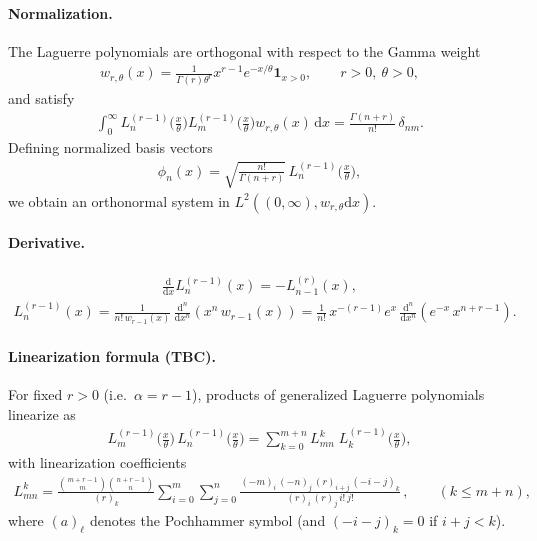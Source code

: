\documentclass[a4paper,11pt]{article}
\numberwithin{equation}{section}
\theoremstyle{plain}
\theoremstyle{definition}
\theoremstyle{remark}
\newcommand{\1}{\ensuremath{\mathds{1}}\xspace}
\newcommand{\dd}{\ensuremath{{\textrm{d}}}\xspace}
\begin{document}
\paragraph{Normalization.}
The Laguerre polynomials are orthogonal with respect to the Gamma weight
\begin{align}
w_{r,\theta}(x)
=
\frac{1}{\Gamma(r)\theta^r}
x^{r-1}e^{-x/\theta}\mathbf{1}_{x>0},
\qquad r>0,\ \theta>0,
\end{align}
and satisfy
\begin{align}
\int_0^\infty
L_n^{(r-1)}\!\Big(\frac{x}{\theta}\Big)
L_m^{(r-1)}\!\Big(\frac{x}{\theta}\Big)
w_{r,\theta}(x)\,\dd x
=
\frac{\Gamma(n+r)}{n!}\,\delta_{nm}.
\end{align}
Defining normalized basis vectors
\begin{align}
\phi_n(x)
=
\sqrt{\frac{n!}{\Gamma(n+r)}}
\,L_n^{(r-1)}\!\Big(\frac{x}{\theta}\Big),
\end{align}
we obtain an orthonormal system in $L^2((0,\infty),w_{r,\theta}\dd x)$.
\paragraph{Derivative.}
\begin{align}
\frac{\dd}{\dd x}L_n^{(r-1)}(x)=-L_{n-1}^{(r)}(x),
\end{align}
\begin{align}
L_n^{(r-1)}(x)
=\frac{1}{n!\,w_{r-1}(x)}\,\frac{\dd^n}{\dd x^n}\!\left(x^n\,w_{r-1}(x)\right)
=\frac{1}{n!}\,x^{-(r-1)}e^{x}\,\frac{\dd^n}{\dd x^n}\!\left(e^{-x}\,x^{n+r-1}\right).
\end{align}
\paragraph{Linearization formula (TBC).}
For fixed $r>0$ (i.e.\ $\alpha=r-1$), products of generalized Laguerre polynomials linearize as
\begin{align}
L_m^{(r-1)}\!\Big(\frac{x}{\theta}\Big)\,L_n^{(r-1)}\!\Big(\frac{x}{\theta}\Big)
=\sum_{k=0}^{m+n} L^{k}_{mn}\;L_k^{(r-1)}\!\Big(\frac{x}{\theta}\Big),
\end{align}
with linearization coefficients
\begin{align}
L^{k}_{mn}
=\frac{\binom{m+r-1}{m}\binom{n+r-1}{n}}{(r)_k}
\sum_{i=0}^{m}\sum_{j=0}^{n}
\frac{(-m)_i\,(-n)_j\,(r)_{i+j}\,(-i-j)_k}{(r)_i\,(r)_j\,i!\,j!}\,,
\qquad (k\le m+n),
\end{align}
where $(a)_\ell$ denotes the Pochhammer symbol (and $(-i-j)_k=0$ if $i+j<k$).%
\end{document}
